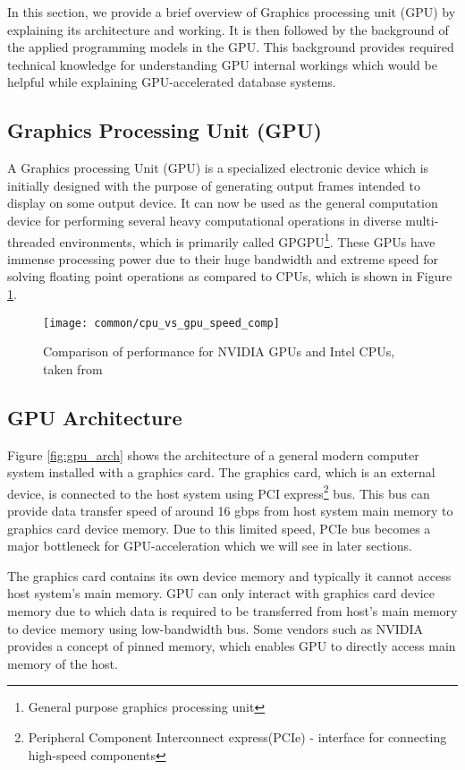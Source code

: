 In this section, we provide a brief overview of Graphics processing unit (GPU) by explaining its architecture and working. It is then followed by the background of the applied programming models in the GPU. This background provides required technical knowledge for understanding GPU internal workings which would be helpful while explaining GPU-accelerated database systems.

\subsection*{Graphics Processing Unit (GPU)}
A Graphics processing Unit (GPU) is a specialized electronic device which is initially designed with the purpose of generating output frames intended to display on some output device. It can now be used as the general computation device for performing several heavy computational operations in diverse multi-threaded environments, which is primarily called GPGPU\footnote{General purpose graphics processing unit}. These GPUs have immense processing power due to their huge bandwidth and extreme speed for solving floating point operations as compared to CPUs, which is shown in Figure \ref{fig:gpu_comp}.

\begin{figure}[ht]
\centering
\texttt{[image: common/cpu\_vs\_gpu\_speed\_comp]}
\caption{Comparison of performance for NVIDIA GPUs and Intel CPUs, taken from \cite{gpu_comparison}}
\label{fig:gpu_comp}
\end{figure}

\subsection*{GPU Architecture}
Figure \ref{fig:gpu_arch} shows the architecture of a general modern computer system installed with a graphics card. The graphics card, which is an external device, is connected to the host system using PCI express\footnote{Peripheral Component Interconnect express(PCIe) - interface for connecting high-speed components} bus. This bus can provide data transfer speed of around 16 gbps from host system main memory to graphics card device memory. Due to this limited speed, PCIe bus becomes a major bottleneck for GPU-acceleration which we will see in later sections.

The graphics card contains its own device memory and typically it cannot access host system's main memory. GPU can only interact with graphics card device memory due to which data is required to be transferred from host's main memory to device memory using low-bandwidth bus. Some vendors such as NVIDIA provides a concept of pinned memory, which enables GPU to directly access main memory of the host.

